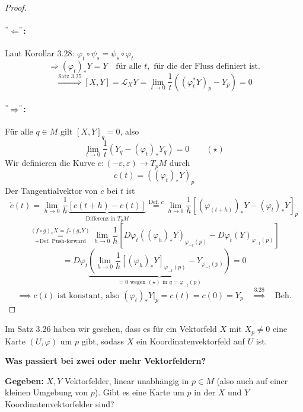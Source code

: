 \documentclass[fleqn, 12pt, letterpaper]{article}
\newcommand{\txt}[1]{\text{#1}}
\begin{document}
\begin{proof}
\quad
\paragraph{$^"\Leftarrow^"$:}Laut Korollar 3.28: $\varphi_t \circ \psi_s = \psi_s \circ \varphi_t$
\[
\Rightarrow (\varphi_t)_*Y=Y \quad \text{für alle } t, \text{ für die der Fluss definiert ist.}
\]
\[
\overset{\txt{Satz 3.25}}{\Rightarrow} [X,Y]=\mathcal{L}_XY=\lim_{t \to 0} \frac{1}{t} \left((\varphi_t^* Y)_p - Y_p\right)=0
\]
\paragraph{$^"\Rightarrow^"$:} Für alle $q \in M$ gilt $[X, Y]_q = 0$, also 
\[
\lim_{t \to 0} \frac{1}{t} \left( Y_q - (\varphi_t)_* Y_q \right) = 0 \qquad (\star)
\]
Wir definieren die Kurve $c: (-\varepsilon, \varepsilon) \rightarrow T_p M$ durch 
\[
c(t) = ((\varphi_t)_* Y)_p
\]
Der Tangentialvektor von $c$ bei $t$ ist
\[
\dot{c}(t) = \lim_{h \to 0} \frac{1}{h}\underbrace{\left[c(t + h) - c(t)\right]}_{{\txt{Differenz in }  T_pM}} \overset{\txt{Def. }c}{=} \lim_{h \to 0} \frac{1}{h} \left[ (\varphi_{(t+h)})_* Y - (\varphi_t)_* Y \right]_p
\]
\[
\underset{+\txt{Def. Push-forward}}{\overset{(f\circ g)_*X=f_*(g_*Y)}{=}} \lim_{h \to 0} \frac{1}{h} \left[ D \varphi_t ((\varphi_{h})_*Y)_{\varphi_{-t}(p)} - D \varphi_t(Y)_{\varphi_{-t}(p)} \right]
\]
\[
=D \varphi_t \underbrace{\left( \lim_{h \to 0} \frac{1}{h} \left[ (\varphi_h)_* Y \right]_{\varphi_{-t}(p)} - Y_{\varphi_{-t}(p)} \right)}_{=0 \txt{ wegen } (\star) \txt{ in } q=\varphi_{-t}(p)} = 0
\]
\[
\implies c(t) \text{ ist konstant, also } (\varphi_t)_\ast Y|_p = c(t) = c(0) = Y_p \quad \overset{{3.28}}{\Longrightarrow} \quad \text{Beh.}
\]
\end{proof}

Im Satz 3.26 haben wir gesehen, dass es für ein Vektorfeld $X$ mit $X_p \neq 0$ eine Karte $(U, \varphi)$ um $p$ gibt, sodass $X$ ein Koordinatenvektorfeld auf $U$ ist.

\vspace{1em}

\textbf{Was passiert bei zwei oder mehr Vektorfeldern?}

\vspace{1em}

\textbf{Gegeben:} $X, Y$ Vektorfelder, linear unabhängig in $p \in M$ (also auch auf einer kleinen Umgebung von $p$). Gibt es eine Karte um $p$ in der $X$ und $Y$ Koordinatenvektorfelder sind?
\end{document}
